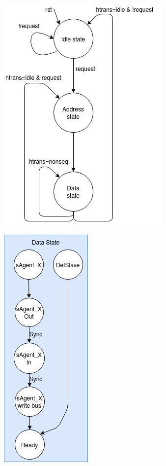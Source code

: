 \begin{figure}[ht!]
	\centering
	\begin{minipage}[t]{0.49\textwidth}
		\centering
		\includegraphics[scale=0.5]{figs/ESL/Bus_fsm_new.png}
		\label{fig:OC}
	\end{minipage}
	\begin{minipage}[t]{0.49\textwidth}
		\centering
		\includegraphics[scale=0.5]{figs/ESL/Data_state.png}
		\label{fig:eslfsm}
	\end{minipage}
\end{figure}


